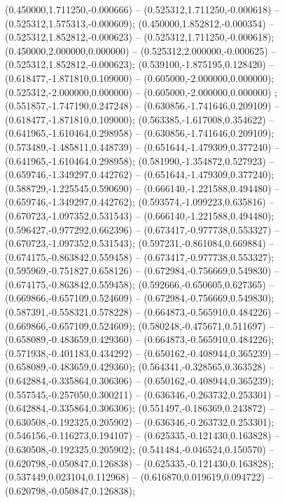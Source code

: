  (0.450000,1.711250,-0.000666) -- (0.525312,1.711250,-0.000618) -- (0.525312,1.575313,-0.000609);
 (0.450000,1.852812,-0.000354) -- (0.525312,1.852812,-0.000623) -- (0.525312,1.711250,-0.000618);
 (0.450000,2.000000,0.000000) -- (0.525312,2.000000,-0.000625) -- (0.525312,1.852812,-0.000623);
 (0.539100,-1.875195,0.128420) -- (0.618477,-1.871810,0.109000) -- (0.605000,-2.000000,0.000000);
 (0.525312,-2.000000,0.000000) -- (0.605000,-2.000000,0.000000) ;
 (0.551857,-1.747190,0.247248) -- (0.630856,-1.741646,0.209109) -- (0.618477,-1.871810,0.109000);
 (0.563385,-1.617008,0.354622) -- (0.641965,-1.610464,0.298958) -- (0.630856,-1.741646,0.209109);
 (0.573489,-1.485811,0.448739) -- (0.651644,-1.479309,0.377240) -- (0.641965,-1.610464,0.298958);
 (0.581990,-1.354872,0.527923) -- (0.659746,-1.349297,0.442762) -- (0.651644,-1.479309,0.377240);
 (0.588729,-1.225545,0.590690) -- (0.666140,-1.221588,0.494480) -- (0.659746,-1.349297,0.442762);
 (0.593574,-1.099223,0.635816) -- (0.670723,-1.097352,0.531543) -- (0.666140,-1.221588,0.494480);
 (0.596427,-0.977292,0.662396) -- (0.673417,-0.977738,0.553327) -- (0.670723,-1.097352,0.531543);
 (0.597231,-0.861084,0.669884) -- (0.674175,-0.863842,0.559458) -- (0.673417,-0.977738,0.553327);
 (0.595969,-0.751827,0.658126) -- (0.672984,-0.756669,0.549830) -- (0.674175,-0.863842,0.559458);
 (0.592666,-0.650605,0.627365) -- (0.669866,-0.657109,0.524609) -- (0.672984,-0.756669,0.549830);
 (0.587391,-0.558321,0.578228) -- (0.664873,-0.565910,0.484226) -- (0.669866,-0.657109,0.524609);
 (0.580248,-0.475671,0.511697) -- (0.658089,-0.483659,0.429360) -- (0.664873,-0.565910,0.484226);
 (0.571938,-0.401183,0.434292) -- (0.650162,-0.408944,0.365239) -- (0.658089,-0.483659,0.429360);
 (0.564341,-0.328565,0.363528) -- (0.642884,-0.335864,0.306306) -- (0.650162,-0.408944,0.365239);
 (0.557545,-0.257050,0.300211) -- (0.636346,-0.263732,0.253301) -- (0.642884,-0.335864,0.306306);
 (0.551497,-0.186369,0.243872) -- (0.630508,-0.192325,0.205902) -- (0.636346,-0.263732,0.253301);
 (0.546156,-0.116273,0.194107) -- (0.625335,-0.121430,0.163828) -- (0.630508,-0.192325,0.205902);
 (0.541484,-0.046524,0.150570) -- (0.620798,-0.050847,0.126838) -- (0.625335,-0.121430,0.163828);
 (0.537449,0.023104,0.112968) -- (0.616870,0.019619,0.094722) -- (0.620798,-0.050847,0.126838);
